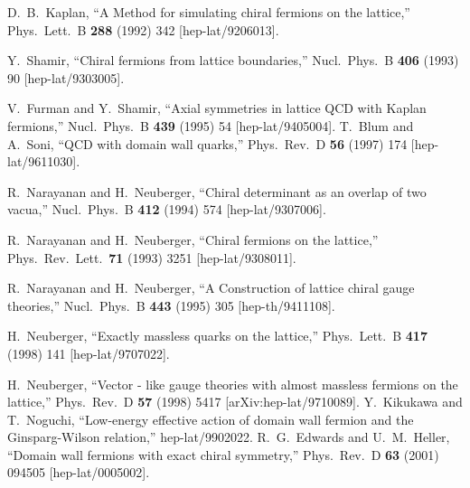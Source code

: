 \documentclass[letter,10pt]{report}
\begin{document}
\begin{thebibliography}{99}

  D.~B.~Kaplan,
  ``A Method for simulating chiral fermions on the lattice,''
  Phys.\ Lett.\ B {\bf 288} (1992) 342
  [hep-lat/9206013].

  Y.~Shamir,
  ``Chiral fermions from lattice boundaries,''
  Nucl.\ Phys.\ B {\bf 406} (1993) 90
  [hep-lat/9303005].


  V.~Furman and Y.~Shamir,
  ``Axial symmetries in lattice QCD with Kaplan fermions,''
  Nucl.\ Phys.\ B {\bf 439} (1995) 54
  [hep-lat/9405004].
  T.~Blum and A.~Soni,
  ``QCD with domain wall quarks,''
  Phys.\ Rev.\ D {\bf 56} (1997) 174
  [hep-lat/9611030].

  R.~Narayanan and H.~Neuberger,
  ``Chiral determinant as an overlap of two vacua,''
  Nucl.\ Phys.\ B {\bf 412} (1994) 574
  [hep-lat/9307006].

  R.~Narayanan and H.~Neuberger,
  ``Chiral fermions on the lattice,''
  Phys.\ Rev.\ Lett.\  {\bf 71} (1993) 3251
  [hep-lat/9308011].

  R.~Narayanan and H.~Neuberger,
  ``A Construction of lattice chiral gauge theories,''
  Nucl.\ Phys.\ B {\bf 443} (1995) 305
  [hep-th/9411108].

  H.~Neuberger,
  ``Exactly massless quarks on the lattice,''
  Phys.\ Lett.\ B {\bf 417} (1998) 141
  [hep-lat/9707022].



%
  H.~Neuberger,
  ``Vector - like gauge theories with almost massless fermions on the lattice,''
  Phys.\ Rev.\  D {\bf 57} (1998) 5417
  [arXiv:hep-lat/9710089].
  Y.~Kikukawa and T.~Noguchi,
  ``Low-energy effective action of domain wall fermion and the Ginsparg-Wilson relation,''
  hep-lat/9902022.
  R.~G.~Edwards and U.~M.~Heller,
  ``Domain wall fermions with exact chiral symmetry,''
  Phys.\ Rev.\ D {\bf 63} (2001) 094505
  [hep-lat/0005002].


\end{thebibliography}
\end{document}
